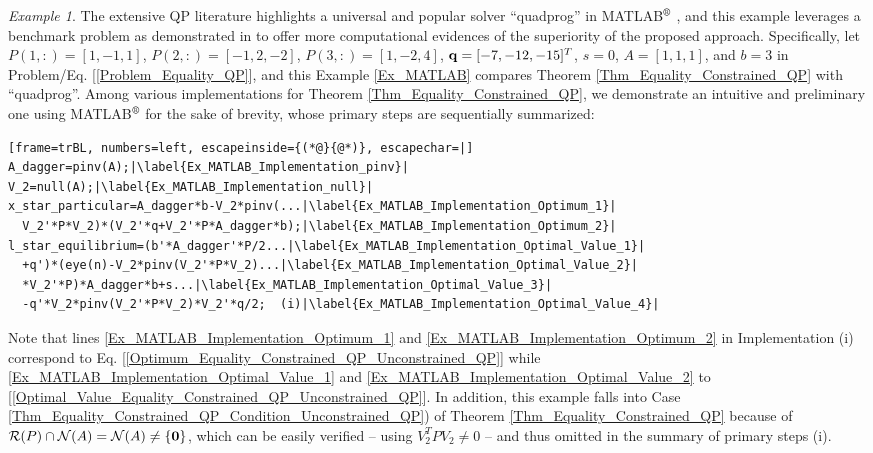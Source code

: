 \documentclass[9pt,twocolumn,twoside,lineno]{pnas-new-1}
\newcommand{\bfq}{{\bf q}}
\newcommand{\bfzero}{{\bf 0}}
\newcommand{\calN}{{\mathcal N}}
\newcommand{\calR}{{\mathcal R}}
\theoremstyle{remark}
\newtheorem{example}{Example}[section]
\begin{document}
\begin{example}
The extensive QP literature highlights a universal and popular solver ``quadprog'' in MATLAB$\textsuperscript{\textregistered}$ \citep{TsMa:21}, and this example leverages a benchmark problem as demonstrated in \cite{MATLAB} to offer more computational evidences of the superiority of the proposed approach. Specifically, let $P(1,:)=[1,-1,1]$, $P(2,:)=[-1,2,-2]$, $P(3,:)=[1,-2,4]$, $\bfq=[-7,-12,-15]^T$, $s=0$, $A=[1,1,1]$, and $b=3$ in Problem/Eq. [\ref{Problem_Equality_QP}], and this Example \ref{Ex_MATLAB} compares Theorem \ref{Thm_Equality_Constrained_QP} with ``quadprog''. Among various implementations for Theorem \ref{Thm_Equality_Constrained_QP}, we demonstrate an intuitive and preliminary one using MATLAB$\textsuperscript{\textregistered}$ for the sake of brevity, whose primary steps are sequentially summarized:

\vspace{0.2cm}\hspace{0.1cm}\begin{minipage}{0.45\textwidth}
\begin{lstlisting}[frame=trBL, numbers=left, escapeinside={(*@}{@*)}, escapechar=|]
A_dagger=pinv(A);|\label{Ex_MATLAB_Implementation_pinv}|
V_2=null(A);|\label{Ex_MATLAB_Implementation_null}|
x_star_particular=A_dagger*b-V_2*pinv(...|\label{Ex_MATLAB_Implementation_Optimum_1}|
  V_2'*P*V_2)*(V_2'*q+V_2'*P*A_dagger*b);|\label{Ex_MATLAB_Implementation_Optimum_2}|
l_star_equilibrium=(b'*A_dagger'*P/2...|\label{Ex_MATLAB_Implementation_Optimal_Value_1}|
  +q')*(eye(n)-V_2*pinv(V_2'*P*V_2)...|\label{Ex_MATLAB_Implementation_Optimal_Value_2}|
  *V_2'*P)*A_dagger*b+s...|\label{Ex_MATLAB_Implementation_Optimal_Value_3}|
  -q'*V_2*pinv(V_2'*P*V_2)*V_2'*q/2;  (i)|\label{Ex_MATLAB_Implementation_Optimal_Value_4}|
\end{lstlisting}
\end{minipage}

\noindent Note that lines \ref{Ex_MATLAB_Implementation_Optimum_1} and \ref{Ex_MATLAB_Implementation_Optimum_2} in Implementation (i) correspond to Eq. [\ref{Optimum_Equality_Constrained_QP_Unconstrained_QP}] while \ref{Ex_MATLAB_Implementation_Optimal_Value_1} and \ref{Ex_MATLAB_Implementation_Optimal_Value_2} to [\ref{Optimal_Value_Equality_Constrained_QP_Unconstrained_QP}]. In addition, this example falls into Case \ref{Thm_Equality_Constrained_QP_Condition_Unconstrained_QP}) of Theorem \ref{Thm_Equality_Constrained_QP} because of $\calR(P)\cap\calN(A)=\calN(A)\ne\{\bfzero\}$, which can be easily verified -- using $V_2^TPV_2\ne 0$ -- and thus omitted in the summary of primary steps (i).


\end{example}
\end{document}
